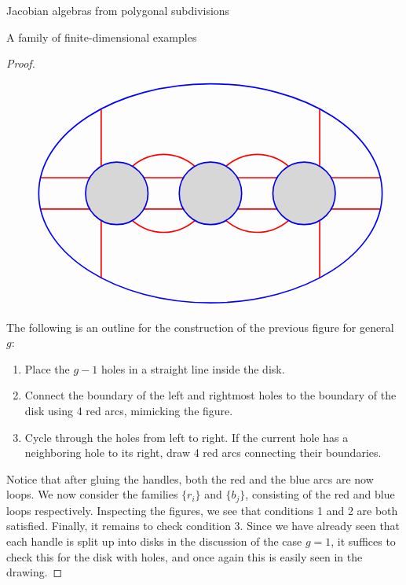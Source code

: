 \begin{chapter}{Jacobian algebras from polygonal subdivisions}
\begin{section}{A family of finite-dimensional examples}
\begin{proof}
\begin{figure}[h]
\[
\begin{tikzpicture}
\draw[red, very thick] (-5.44, 0.5) -- (-3.87, 0.5);
\draw[red, very thick] (-5.44, -0.5) -- (-3.87, -0.5);
\draw[red, very thick] (5.44, 0.5) -- (3.87, 0.5);
\draw[red, very thick] (5.44, -0.5) -- (3.87, -0.5);

\draw[red, very thick] (-3.5,0.87) -- (-3.5,2.7);
\draw[red, very thick] (-3.5,-0.87) -- (-3.5,-2.7);
\draw[red, very thick] (3.5,0.87) -- (3.5,2.7);
\draw[red, very thick] (3.5,-0.87) -- (3.5,-2.7);

\draw[red, very thick] (-2.137, 0.5) -- (-0.863, 0.5);
\draw[red, very thick] (-2.137, -0.5) -- (-0.863, -0.5);
\draw[red, very thick] (2.137, 0.5) -- (0.863, 0.5);
\draw[red, very thick] (2.137, -0.5) -- (0.863, -0.5);

\draw[red, very thick] (-2.5,0.87) to [bend left=40] (-0.5,0.87);
\draw[red, very thick] (2.5,0.87) to [bend right=40] (0.5,0.87);
\draw[red, very thick] (-2.5,-0.87) to [bend right=40] (-0.5,-0.87);
\draw[red, very thick] (2.5,-0.87) to [bend left=40] (0.5,-0.87);

\draw[blue, very thick] (0,0) ellipse (5.5cm and 3.5cm);
\draw[blue, very thick] (0,0) circle (1cm);
\draw[blue, very thick] (-3,0) circle (1cm);
\draw[blue, very thick] (3,0) circle (1cm);
\fill [black,opacity=.15] (-3,0) circle (1cm);
\fill [black,opacity=.15] (0,0) circle (1cm);
\fill [black,opacity=.15] (3,0) circle (1cm);
\end{tikzpicture}
\]
\end{figure}

The following is an outline for the construction of the previous figure for general $g$:
\begin{enumerate}
\item Place the $g-1$ holes in a straight line inside the disk.
\item Connect the boundary of the left and rightmost holes to the boundary of the disk using 4 red arcs, mimicking the figure.
\item Cycle through the holes from left to right. If the current hole has a neighboring hole to its right, draw 4 red arcs connecting their boundaries.
\end{enumerate}

Notice that after gluing the handles, both the red and the blue arcs are now loops. We now consider the families $\{r_i\}$ and $\{b_j\}$, consisting of the red and blue loops respectively. Inspecting the figures, we see that conditions 1 and 2 are both satisfied. Finally, it remains to check condition 3. Since we have already seen that each handle is split up into disks in the discussion of the case $g=1$, it suffices to check this for the disk with holes, and once again this is easily seen in the drawing.
\end{proof}


\end{section}
\end{chapter}
